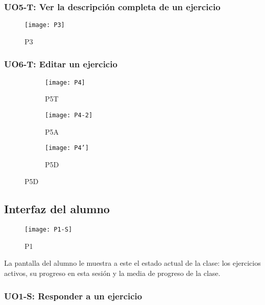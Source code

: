 \subsubsection{UO5-T: Ver la descripción completa de un ejercicio}
\label{diseno-e-implementacion:interfaces:profesor:uo5-t}

\begin{figure}[H]
	\centering
	\texttt{[image: P3]}
	\caption{P3}
	\label{diseno-e-implementacion:interfaces:profesor:uo5-t:p3}
\end{figure}

\subsubsection{UO6-T: Editar un ejercicio}
\label{diseno-e-implementacion:interfaces:profesor:uo6-t}

\begin{figure}[H]
\begin{subfigure}[b]{0.3\textwidth}
	\centering
	\texttt{[image: P4]}
	\caption{P5T}
	\label{fig:req-autenticacion:p0}
\end{subfigure}
%
\begin{subfigure}[b]{0.3\textwidth}
	\centering
	\texttt{[image: P4-2]}
	\caption{P5A}
	\label{fig:req-autenticacion:p0'}
\end{subfigure}
%
\begin{subfigure}[b]{0.3\textwidth}
	\centering
	\texttt{[image: P4']}
	\caption{P5D}
	\label{fig:fsm-autenticacion}
\end{subfigure}

\label{fig:autenticacion}
\end{figure}

\subsection{Interfaz del alumno}
\label{diseno-e-implementacion:interfaces:alumno}

\begin{figure}[H]
	\centering
	\texttt{[image: P1-S]}
	\caption{P1}
	\label{diseno-e-implementacion:interfaces:alumno:p1}
\end{figure}

La pantalla del alumno le muestra a este el estado actual de la clase: los ejercicios activos, su progreso en esta sesión y la media de progreso de la clase.

\subsubsection{UO1-S: Responder a un ejercicio}
\label{diseno-e-implementacion:interfaces:alumno:uo1-s}

